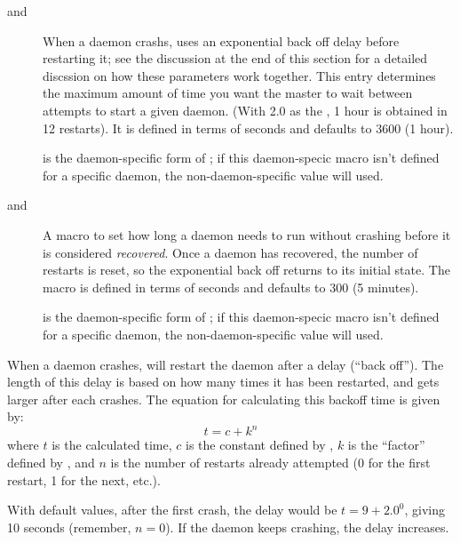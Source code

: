 \begin{description}
\item[ and
      ]
  \label{param:MasterBackoffCeiling}
  When a daemon crashs,  uses an exponential back off
  delay before restarting it; see the discussion at the end of this
  section for a detailed discssion on how these parameters work together.
  This entry determines the maximum amount of time you want the master
  to wait between attempts to start a given daemon.
  (With 2.0 as the ,
  1 hour is obtained in 12 restarts).  It is defined in terms of
  seconds and defaults to 3600 (1 hour).

   is the daemon-specific
  form of ; if this daemon-specic
  macro isn't defined for a specific daemon, the non-daemon-specific
  value will used.

\item[ and
      ]
  \label{param:MasterRecoverFactor}  A macro to set how long a daemon 
  needs to run without crashing before it is considered \emph{recovered}.
  Once a
  daemon has recovered, the number of restarts is reset, so the
  exponential back off returns to its initial state.  
  The macro is defined in
  terms of seconds and defaults to 300 (5 minutes).

   is the daemon-specific
  form of ; if this daemon-specic
  macro isn't defined for a specific daemon, the non-daemon-specific
  value will used.

\end{description}

When a daemon crashes,  will restart the daemon after a
delay (``back off'').
The length of this delay is based on how many times it has been
restarted, and gets larger after each crashes. 
The equation for calculating this backoff time is
given by: $$t = c + k^n$$ where $t$ is the calculated time, $c$ is
the constant defined by , $k$ is
the ``factor'' defined by , and $n$
is the number of restarts already attempted (0 for the first restart,
1 for the next, etc.).

With default values, after the first crash, the delay would be $t = 9
+ 2.0^0$, giving 10 seconds (remember, $n = 0$).  If the daemon keeps
crashing, the delay increases.

